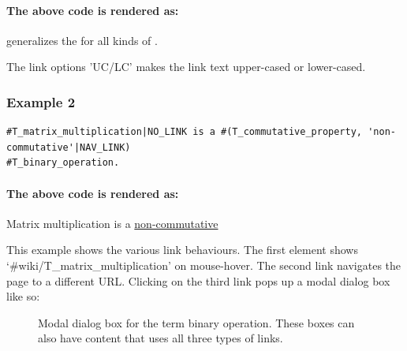 \documentclass[a4paper]{article}
\begin{document}
\paragraph{The above code is rendered as:}
\begin{mdframed}
 generalizes the  for all kinds of .
\end{mdframed}

The link options 'UC/LC' makes the link text upper-cased or lower-cased.

\subsubsection*{Example 2}
\begin{verbatim}
#T_matrix_multiplication|NO_LINK is a #(T_commutative_property, 'non-commutative'|NAV_LINK)
#T_binary_operation.
\end{verbatim}

\paragraph{The above code is rendered as:}
\begin{mdframed}
Matrix multiplication is a \underline{non-commutative} 
\end{mdframed}
This example shows the various link behaviours. The first element shows `\#wiki/T\_matrix\_multiplication' on mouse-hover. The second link navigates the page to a different URL. Clicking on the third link pops up a modal dialog box like so:

\begin{figure}[htbp]
\begin{center}
\caption{Modal dialog box for the term binary operation. These boxes can also have content that uses all three types of links. }
\label{modal}
\end{center}
\end{figure}
\end{document}
